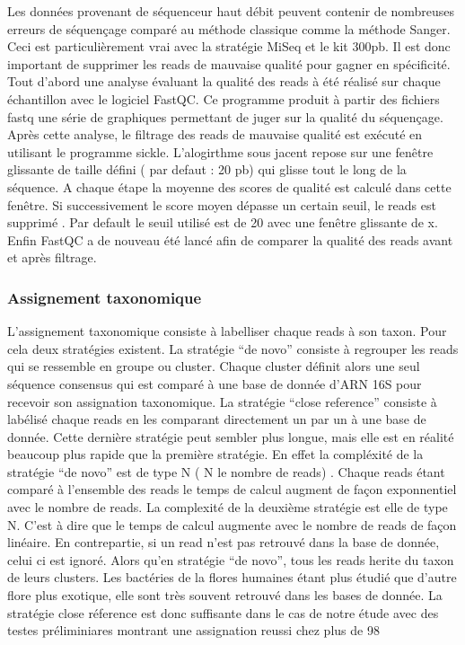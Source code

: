 \documentclass[12pt,a4paper]{article}
\begin{document}
Les données provenant de séquenceur haut débit peuvent contenir de nombreuses erreurs de séquençage comparé au méthode classique comme la méthode Sanger. Ceci est particulièrement vrai avec la stratégie MiSeq et le kit 300pb. Il est donc important de supprimer les reads de mauvaise qualité pour gagner en spécificité.
Tout d’abord une analyse évaluant la qualité des reads à été réalisé sur chaque échantillon avec le logiciel FastQC. Ce programme produit à partir des fichiers fastq une série de graphiques permettant de juger sur la qualité du séquençage.
Après cette analyse, le filtrage des reads de mauvaise qualité est exécuté en utilisant le programme sickle. L’alogirthme sous jacent repose sur une fenêtre glissante de taille défini ( par defaut : 20 pb) qui glisse tout le long de la séquence. A chaque étape la moyenne des scores de qualité est calculé dans cette fenêtre. Si successivement le score moyen dépasse un certain seuil, le reads est supprimé . Par default le seuil utilisé est de 20 avec une fenêtre glissante de x.
Enfin FastQC a de nouveau été lancé afin de comparer la qualité des reads avant et après filtrage.

\subsubsection{Assignement taxonomique}

L’assignement taxonomique consiste à labelliser chaque reads à son taxon. Pour cela deux stratégies existent.
La stratégie “de novo” consiste à regrouper les reads qui se ressemble en groupe ou cluster.
Chaque cluster définit alors une seul séquence consensus qui est comparé à une base de donnée d’ARN 16S pour recevoir son assignation taxonomique.
La stratégie “close reference” consiste à labélisé chaque reads en les comparant directement un par un à une base de donnée. Cette dernière stratégie peut sembler plus longue, mais elle est en réalité beaucoup plus rapide que la première stratégie. En effet la compléxité de la stratégie “de novo” est de type N ( N le nombre de reads) . Chaque reads étant comparé à l’ensemble des reads le temps de calcul augment de façon exponnentiel avec le nombre de reads.
La complexité de la deuxième stratégie est elle de type N. C’est à dire que le temps de calcul augmente avec le nombre de reads de façon linéaire. En contrepartie, si un read n’est pas retrouvé dans la base de donnée, celui ci est ignoré. Alors qu’en stratégie “de novo”, tous les reads herite du taxon de leurs clusters.
Les bactéries de la flores humaines étant plus étudié que d’autre flore plus exotique, elle sont très souvent retrouvé dans les bases de donnée. La stratégie close réference est donc suffisante dans le cas de notre étude avec des testes préliminiares montrant une assignation reussi chez plus de 98%
\end{document}

